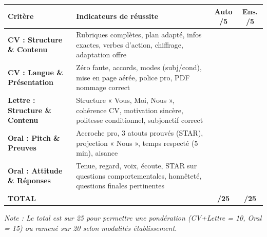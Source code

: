 \documentclass[11pt]{article}
\begin{document}
\begin{exemplebox}
\begin{center}
\begin{tabularx}{\linewidth}{|l|X|c|c|}
\hline
\rowcolor{popblueL} \textbf{Critère} & \textbf{Indicateurs de réussite} & \textbf{Auto /5} & \textbf{Ens. /5} \\
\hline
\textbf{CV : Structure \& Contenu} & Rubriques complètes, plan adapté, infos exactes, verbes d'action, chiffrage, adaptation offre & & \\
\hline
\textbf{CV : Langue \& Présentation} & Zéro faute, accords, modes (subj/cond), mise en page aérée, police pro, PDF nommage correct & & \\
\hline
\textbf{Lettre : Structure \& Contenu} & Structure « Vous, Moi, Nous », cohérence CV, motivation sincère, politesse conditionnel, subjonctif correct & & \\
\hline
\textbf{Oral : Pitch \& Preuves} & Accroche pro, 3 atouts prouvés (STAR), projection « Nous », temps respecté (5 min), aisance & & \\
\hline
\textbf{Oral : Attitude \& Réponses} & Tenue, regard, voix, écoute, STAR sur questions comportementales, honnêteté, questions finales pertinentes & & \\
\hline
\textbf{TOTAL} & & \textbf{/25} & \textbf{/25} \\
\hline
\end{tabularx}
\end{center}
\emph{Note : Le total est sur 25 pour permettre une pondération (CV+Lettre = 10, Oral = 15) ou ramené sur 20 selon modalités établissement.}
\end{exemplebox}
\end{document}
